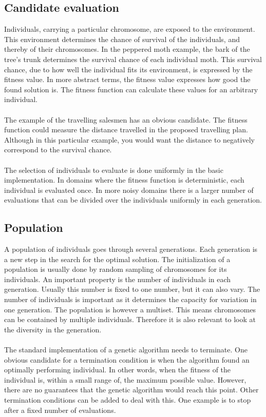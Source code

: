 \subsection{Candidate evaluation}
Individuals, carrying a particular chromosome, are exposed to the environment.
This environment determines the chance of survival of the individuals, and
thereby of their chromosomes. In the peppered moth example, the bark of the
tree's trunk determines the survival chance of each individual moth. This
survival chance, due to how well the individual fits its environment, is
expressed by the fitness value. In more abstract terms, the fitness value
expresses how good the found solution is. The fitness function can calculate
these values for an arbitrary individual.\\\\
\noindent
The example of the travelling salesmen has an obvious candidate. The fitness
function could measure the distance travelled in the proposed travelling plan.
Although in this particular example, you would want the distance to negatively
correspond to the survival chance.\\\\
\noindent
The selection of individuals to evaluate is done uniformly in the basic
implementation. In domains where the fitness function is deterministic, each
individual is evaluated once. In more noisy domains there is a larger number of
evaluations that can be divided over the individuals uniformly in each
generation.
\subsection{Population}
A population of individuals goes through several generations. Each generation
is a new step in the search for the optimal solution. The initialization of a
population is usually done by random sampling of chromosomes for its
individuals. An important property is the number of individuals in each
generation. Usually this number is fixed to one number, but it can also vary.
The number of individuals is important as it determines the capacity for
variation in one generation. The population is however a multiset. This means
chromosomes can be contained by multiple individuals. Therefore it is also
relevant to look at the diversity in the generation.\\\\
\noindent
The standard implementation of a genetic algorithm needs to terminate. One
obvious candidate for a termination condition is when the algorithm found an
optimally performing individual. In other words, when the fitness of the
individual is, within a small range of, the maximum possible value. However,
there are no guarantees that the genetic algorithm would reach this point.
Other termination conditions can be added to deal with this. One example is to
stop after a fixed number of evaluations.
